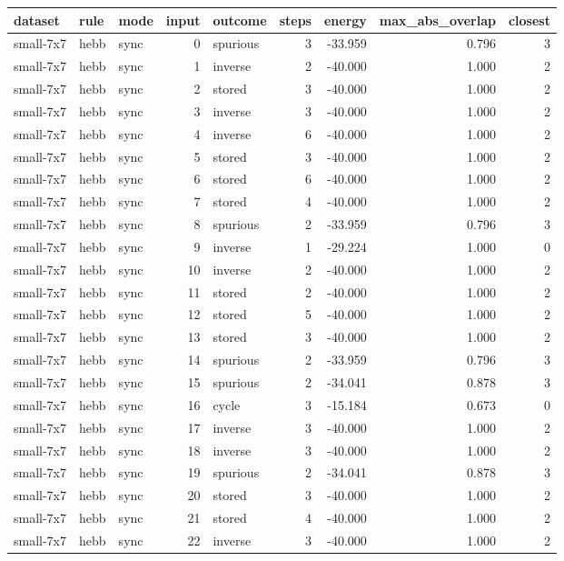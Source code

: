 \begin{tabular}{lllrlrrrr}
\toprule
dataset & rule & mode & input & outcome & steps & energy & max\_abs\_overlap & closest \\
\midrule
small-7x7 & hebb & sync & 0 & spurious & 3 & -33.959 & 0.796 & 3 \\
small-7x7 & hebb & sync & 1 & inverse & 2 & -40.000 & 1.000 & 2 \\
small-7x7 & hebb & sync & 2 & stored & 3 & -40.000 & 1.000 & 2 \\
small-7x7 & hebb & sync & 3 & inverse & 3 & -40.000 & 1.000 & 2 \\
small-7x7 & hebb & sync & 4 & inverse & 6 & -40.000 & 1.000 & 2 \\
small-7x7 & hebb & sync & 5 & stored & 3 & -40.000 & 1.000 & 2 \\
small-7x7 & hebb & sync & 6 & stored & 6 & -40.000 & 1.000 & 2 \\
small-7x7 & hebb & sync & 7 & stored & 4 & -40.000 & 1.000 & 2 \\
small-7x7 & hebb & sync & 8 & spurious & 2 & -33.959 & 0.796 & 3 \\
small-7x7 & hebb & sync & 9 & inverse & 1 & -29.224 & 1.000 & 0 \\
small-7x7 & hebb & sync & 10 & inverse & 2 & -40.000 & 1.000 & 2 \\
small-7x7 & hebb & sync & 11 & stored & 2 & -40.000 & 1.000 & 2 \\
small-7x7 & hebb & sync & 12 & stored & 5 & -40.000 & 1.000 & 2 \\
small-7x7 & hebb & sync & 13 & stored & 3 & -40.000 & 1.000 & 2 \\
small-7x7 & hebb & sync & 14 & spurious & 2 & -33.959 & 0.796 & 3 \\
small-7x7 & hebb & sync & 15 & spurious & 2 & -34.041 & 0.878 & 3 \\
small-7x7 & hebb & sync & 16 & cycle & 3 & -15.184 & 0.673 & 0 \\
small-7x7 & hebb & sync & 17 & inverse & 3 & -40.000 & 1.000 & 2 \\
small-7x7 & hebb & sync & 18 & inverse & 3 & -40.000 & 1.000 & 2 \\
small-7x7 & hebb & sync & 19 & spurious & 2 & -34.041 & 0.878 & 3 \\
small-7x7 & hebb & sync & 20 & stored & 3 & -40.000 & 1.000 & 2 \\
small-7x7 & hebb & sync & 21 & stored & 4 & -40.000 & 1.000 & 2 \\
small-7x7 & hebb & sync & 22 & inverse & 3 & -40.000 & 1.000 & 2 \\

\end{tabular}
